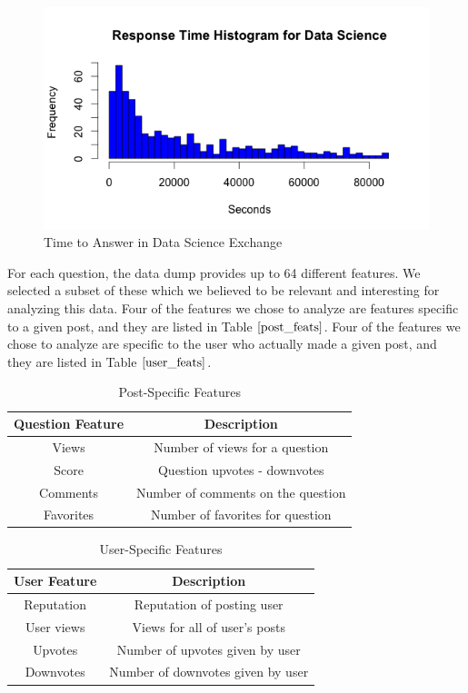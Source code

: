 \documentclass[12pt]{article}
\begin{document}
\begin{figure}[h]
  \centering
  \includegraphics[scale = 0.5]{data_science_histogram.png}
  \caption{Time to Answer in Data Science Exchange}
  \label{ds_hist}
\end{figure}


For each question, the data dump provides up to 64 different features. We selected a subset of these which we believed to be relevant and interesting for analyzing this data. Four of the features we chose to analyze are features specific to a given post, and they are listed in Table $\ref{post_feats}$. Four of the features we chose to analyze are specific to the user who actually made a given post, and they are listed in Table $\ref{user_feats}$. 

\begin{table}[ht]
  \centering
  \begin{tabular}{|c|c|}\hline
    Question Feature & Description \\ \hline
    Views & Number of views for a question \\
    Score & Question upvotes - downvotes \\
    Comments & Number of comments on the question\\
    Favorites & Number of favorites for question\\ \hline
  \end{tabular}
  \caption{Post-Specific Features}
  \label{post_feats}
\end{table}

\begin{table}[ht]
  \centering
  \begin{tabular}{|c|c|}\hline
    User Feature & Description \\ \hline
    Reputation & Reputation of posting user \\
    User views & Views for all of user's posts \\
    Upvotes & Number of upvotes given by user \\
    Downvotes & Number of downvotes given by user \\ \hline
  \end{tabular}
  \caption{User-Specific Features}
  \label{user_feats}
\end{table}
\end{document}
